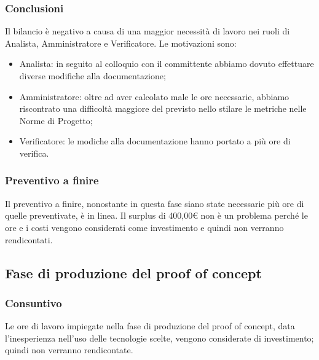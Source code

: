 \subsubsection{Conclusioni}
Il bilancio è negativo a causa di una maggior necessità di lavoro nei ruoli di Analista,  Amministratore e Verificatore.  Le motivazioni sono:
\begin{itemize}
\item Analista: in seguito al colloquio con il committente abbiamo dovuto effettuare diverse modifiche alla documentazione;
\item Amministratore: oltre ad aver calcolato male le ore necessarie,  abbiamo riscontrato una difficoltà maggiore del previsto nello stilare le metriche nelle Norme di Progetto;
\item Verificatore: le modiche alla documentazione hanno portato a più ore di verifica.
\end{itemize}

\subsubsection{Preventivo a finire}
Il preventivo a finire,  nonostante in questa fase siano state necessarie più ore di quelle preventivate,  è in linea.  Il surplus di 400,00\euro \xspace non è un problema perché le ore e i costi vengono considerati come investimento e quindi non verranno rendicontati.


\pagebreak


\subsection{Fase di produzione del proof of concept}
\subsubsection{Consuntivo}
Le ore di lavoro impiegate nella fase di produzione del proof of concept,  data l'inesperienza nell'uso delle tecnologie scelte,  vengono considerate di investimento; quindi non verranno rendicontate.

